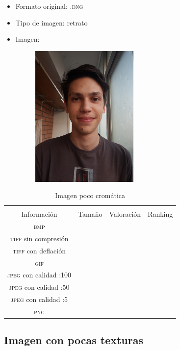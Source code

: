 \documentclass[11pt,a4paper]{article}
\begin{document}
\begin{itemize}
	\item Formato original: \textsc{.dng}
	\item Tipo de imagen: retrato
	\item Imagen:
		\begin{figure}[H]
		\centering
			\includegraphics[width=0.5\textwidth]{Fotos/retrato.jpg}
		\end{figure}	
\end{itemize}

\begin{table}[H]
\centering
\begin{tabular}{|c|c|c|c|}
\hline
\diagbox[width=15em]{\textit{Códec}/Formato}{\\Información} & Tamaño & Valoración & Ranking \\
\hline
\textsc{bmp} &  &  &  \\ \hline
\textsc{tiff} sin compresión &  &  &  \\ \hline
\textsc{tiff} con deflación &  &  &  \\ \hline
\textsc{gif} &  &  &  \\ \hline
\textsc{jpeg} con calidad :100 &  &  &  \\ \hline
\textsc{jpeg} con calidad :50 &  &  &  \\ \hline
\textsc{jpeg} con calidad :5 &  &  &  \\ \hline
\textsc{png} &  &  &  \\ \hline
\end{tabular}
\caption{Imagen poco cromática}
\label{tab:my-table}
\end{table}


\subsection{Imagen con pocas texturas}
\end{document}
